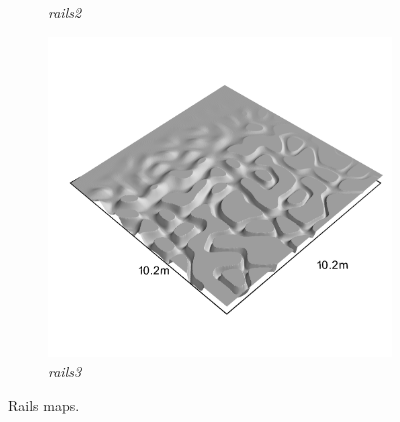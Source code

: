 \documentclass[../document.tex]{subfiles}
\begin{document}
\begin{figure}[H]
\begin{subfigure}[b]{0.23\linewidth}
            \caption{\emph{rails2}}
            \end{subfigure}    
          \begin{subfigure}[b]{0.23\textwidth}
            \includegraphics[width=\textwidth]{../img/hm3d_borders/rails3.png}
            \caption{\emph{rails3}}
        \end{subfigure}    
    \caption{Rails maps.}
\end{figure}
\end{document}
